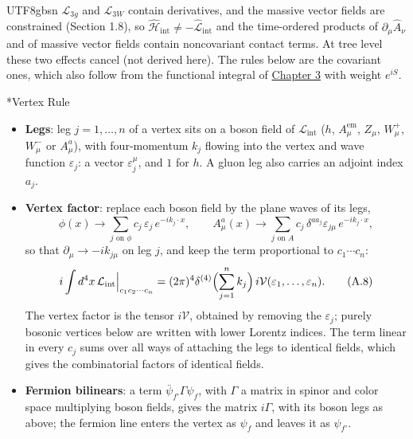 \documentclass[11pt,a4paper,oneside]{report}
\makeatletter
\newcommand\topic{\@startsection{paragraph}{4}{\z@}{-1.7ex plus -.3ex}{.5ex}{\normalfont\normalsize\bfseries\itshape\boldmath}*}
\makeatother
\begin{document}
\begin{CJK*}{UTF8}{gbsn}
$\mathcal L_{3g}$ and $\mathcal L_{3W}$ contain derivatives, and the massive vector fields are constrained (Section 1.8), so $\hat{\mathcal H}_{\mathrm{int}}\neq-\hat{\mathcal L}_{\mathrm{int}}$ and the time-ordered products of $\partial_\mu\hat A_\nu$ and of massive vector fields contain noncovariant contact terms. At tree level these two effects cancel (not derived here). The rules below are the covariant ones, which also follow from the functional integral of \hyperref[qft-ch3]{Chapter 3} with weight $e^{iS}$.

\topic{Vertex Rule}
\begin{itemize}


\item \textbf{\boldmath Legs}: leg $j=1,\ldots,n$ of a vertex sits on a boson field of $\mathcal L_{\mathrm{int}}$ ($h$, $A^{\mathrm{em}}_\mu$, $Z_\mu$, $W^+_\mu$, $W^-_\mu$ or $A^a_\mu$), with four-momentum $k_j$ flowing into the vertex and wave function $\varepsilon_j$: a vector $\varepsilon_j^\mu$, and $1$ for $h$. A gluon leg also carries an adjoint index $a_j$.

\item \textbf{\boldmath Vertex factor}: replace each boson field by the plane waves of its legs,
\begin{equation*}
\phi(x)\to\sum_{j\text{ on }\phi}c_j\,\varepsilon_j\,e^{-ik_j\cdot x},\qquad
A^a_\mu(x)\to\sum_{j\text{ on }A}c_j\,\delta^{aa_j}\varepsilon_{j\mu}\,e^{-ik_j\cdot x},
\tag{A.7}\label{eq:A.7}
\end{equation*}
so that $\partial_\mu\to-ik_{j\mu}$ on leg $j$, and keep the term proportional to $c_1\cdots c_n$:
\begin{equation*}
{\displaystyle i\int d^4x\,\mathcal L_{\mathrm{int}}\Big|_{c_1c_2\cdots c_n}=(2\pi)^4\delta^{(4)}\Bigl(\sum_{j=1}^nk_j\Bigr)\,i\mathcal V(\varepsilon_1,\ldots,\varepsilon_n).}
\tag{A.8}\label{eq:A.8}
\end{equation*}
The vertex factor is the tensor $i\mathcal V$, obtained by removing the $\varepsilon_j$; purely bosonic vertices below are written with lower Lorentz indices. The term linear in every $c_j$ sums over all ways of attaching the legs to identical fields, which gives the combinatorial factors of identical fields.

\item \textbf{\boldmath Fermion bilinears}: a term $\bar\psi_{f'}\Gamma\psi_f$, with $\Gamma$ a matrix in spinor and color space multiplying boson fields, gives the matrix $i\Gamma$, with its boson legs as above; the fermion line enters the vertex as $\psi_f$ and leaves it as $\psi_{f'}$.
\end{itemize}



\end{CJK*}
\end{document}
